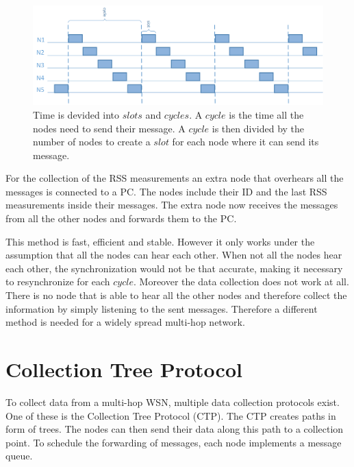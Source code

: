 \begin{figure}[htbp]
	\centering
    \includegraphics[scale=0.8]{content/images/Multispin}
   	\caption{Time is devided into $slots$ and $cycles$. A $cycle$ is the time all the nodes need to send their message. A $cycle$ is then divided by the number of nodes to create a $slot$ for each node where it can send its message. \cite{RtiMulti}}
    \label{fig:multi}
\end{figure}

For the collection of the RSS measurements an extra node that overhears all the messages is connected to a PC. The nodes include their ID and the last RSS measurements inside their messages. The extra node now receives the messages from all the other nodes and forwards them to the PC.  \cite{RtiMulti}

This method is fast, efficient and stable. However it only works under the assumption that all the nodes can hear each other. When not all the nodes hear each other, the synchronization would not be that accurate, making it necessary to resynchronize for each $cycle$. Moreover the data collection does not work at all. There is no node that is able to hear all the other nodes and therefore collect the information by simply listening to the sent messages.
Therefore a different method is needed for a widely spread multi-hop network.

\section{Collection Tree Protocol}
To collect data from a multi-hop WSN, multiple data collection protocols exist. One of these is the Collection Tree Protocol (CTP). The CTP creates paths in form of trees. The nodes can then send their data along this path to a collection point. To schedule the forwarding of messages, each node implements a message queue. 

